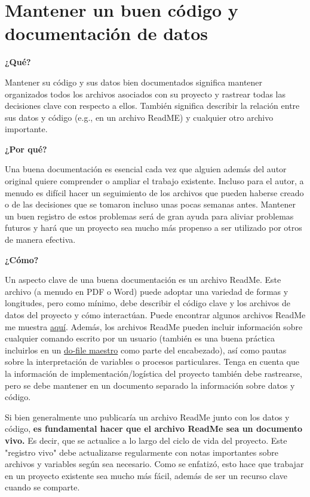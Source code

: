 \documentclass[11pt,en]{elegantpaper}
\begin{document}
\newpage 
\section{Mantener un buen código y documentación de datos}
\textbf{¿Qué?}

Mantener su código y sus datos bien documentados significa mantener organizados todos los archivos asociados con su proyecto y rastrear todas las decisiones clave con respecto a ellos. También significa describir la relación entre sus datos y código (e.g., en un archivo ReadME) y cualquier otro archivo importante.

\textbf{¿Por qué?}

Una buena documentación es esencial cada vez que alguien además del autor original quiere comprender o ampliar el trabajo existente. Incluso para el autor, a menudo es difícil hacer un seguimiento de los archivos que pueden haberse creado o de las decisiones que se tomaron incluso unas pocas semanas antes. Mantener un buen registro de estos problemas será de gran ayuda para aliviar problemas futuros y hará que un proyecto sea mucho más propenso a ser utilizado por otros de manera efectiva.

\textbf{¿Cómo?}

Un aspecto clave de una buena documentación es un archivo ReadMe. Este archivo (a menudo en PDF o Word) puede adoptar una variedad de formas y longitudes, pero como mínimo, debe describir el código clave y los archivos de datos del proyecto y cómo interactúan. Puede encontrar algunos archivos ReadMe me muestra \href{http://www.poverty-action.org/research-transparency/example-readme-files}{aquí}. Además, los archivos ReadMe pueden incluir información sobre cualquier comando escrito por un usuario (también es una buena práctica incluirlos en un \href{http://www.poverty-action.org/research-transparency/example-master}{do-file maestro} como parte del encabezado), así como pautas sobre la interpretación de variables o procesos particulares. Tenga en cuenta que la información de implementación/logística del proyecto también debe rastrearse, pero se debe mantener en un documento separado la información sobre datos y código.

Si bien generalmente uno publicaría un archivo ReadMe junto con los datos y código, \textbf{es fundamental hacer que el archivo ReadMe sea un documento vivo.} Es decir, que se actualice a lo largo del ciclo de vida del proyecto. Este "registro vivo" debe actualizarse regularmente con notas importantes sobre archivos y variables según sea necesario. Como se enfatizó, esto hace que trabajar en un proyecto existente sea mucho más fácil, además de ser un recurso clave cuando se comparte.
\end{document}
